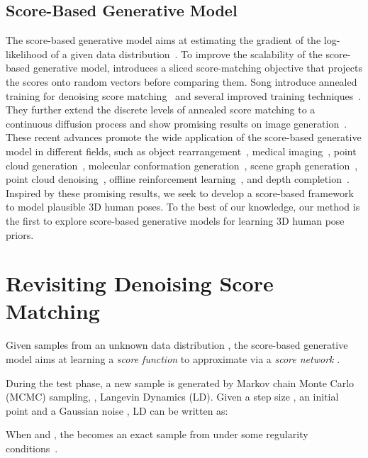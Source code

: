 \documentclass[10pt,twocolumn,letterpaper]{article}
\begin{document}
\subsection{Score-Based Generative Model}
The score-based generative model aims at estimating the gradient of the log-likelihood of a given data distribution~\cite{denosingScoreMatching, hyvarinen2005estimation, song2020sliced, song2019generative, song2020improved, song2020score, song2021maximum}. 
To improve the scalability of the score-based generative model, \cite{song2020sliced} introduces a sliced score-matching objective that projects the scores onto random vectors before comparing them.
Song \etal introduce annealed training for denoising score matching~\cite{song2019generative} and several improved training techniques~\cite{song2020improved}. They further extend the discrete levels of annealed score matching to a continuous diffusion process and show promising results on image generation~\cite{song2020score}.
These recent advances promote the wide application of the score-based generative model in different fields, such as object rearrangement~\cite{wu2022targf}, medical imaging~\cite{song2021solving}, point cloud generation~\cite{cai2020learning}, molecular conformation generation~\cite{shi2021learning}, scene graph generation~\cite{suhail2021energy}, point cloud denoising~\cite{luo2021score}, offline reinforcement learning~\cite{janner2022planning}, and depth completion~\cite{shao2022diffustereo}.
Inspired by these promising results, we seek to develop a score-based framework to model plausible 3D human poses.
To the best of our knowledge, our method is the first to explore score-based generative models for learning 3D human pose priors.
 
\section{Revisiting Denoising Score Matching}\label{sec:preliminary}
Given samples  from an unknown data distribution , 
the score-based generative model aims at learning a \textit{score function} to approximate  via a \textit{score network} .

During the test phase, a new sample is generated by Markov chain Monte Carlo (MCMC) sampling, \eg, Langevin Dynamics (LD). Given a step size , an initial point  and a Gaussian noise , LD can be written as:

When  and , the  becomes an exact sample from  under some regularity conditions~\cite{welling2011bayesian}.
\end{document}

